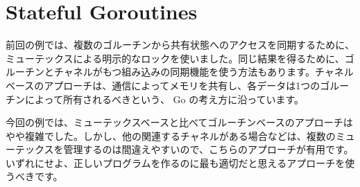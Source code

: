 \section{Stateful Goroutines}

前回の例では、複数のゴルーチンから共有状態へのアクセスを同期するために、ミューテックスによる明示的なロックを使いました。同じ結果を得るために、ゴルーチンとチャネルがもつ組み込みの同期機能を使う方法もあります。チャネルベースのアプローチは、通信によってメモリを共有し、各データは1つのゴルーチンによって所有されるべきという、 Go の考え方に沿っています。




今回の例では、ミューテックスベースと比べてゴルーチンベースのアプローチはやや複雑でした。しかし、他の関連するチャネルがある場合などは、複数のミューテックスを管理するのは間違えやすいので、こちらのアプローチが有用です。いずれにせよ、正しいプログラムを作るのに最も適切だと思えるアプローチを使うべきです。